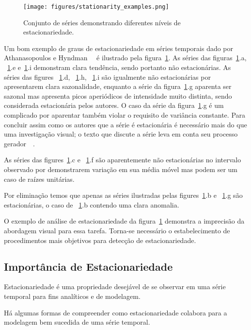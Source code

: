 \begin{figure}[h]
    \centering
    \texttt{[image: figures/stationarity\_examples.png]}
    \caption{Conjunto de séries demonstrando diferentes níveis de
    estacionariedade.}
    \label{fig:stationarity}
\end{figure}

Um bom exemplo de graus de estacionariedade em séries temporais dado por
Athanasopoulos e Hyndman~~\cite{athana} é ilustrado pela
figura~\ref{fig:stationarity}. As séries das figuras~\ref{fig:stationarity}.a,
~\ref{fig:stationarity}.e e~\ref{fig:stationarity}.i demonstram clara
tendência, sendo portanto não estacionárias. As séries das figures
~\ref{fig:stationarity}.d, ~\ref{fig:stationarity}.h, ~\ref{fig:stationarity}.i
são igualmente não estacionárias por apresentarem clara sazonalidade, enquanto
a série da figura~\ref{fig:stationarity}.g aparenta ser sazonal mas apresenta
picos aperiódicos de intensidade muito distinta, sendo considerada estacionária
pelos autores. O caso da série da figura~\ref{fig:stationarity}.g é um
complicado por aparentar também violar o requisito de variância constante. Para
concluir assim como os autores que a série é estacionária é necessário mais do
que uma investigação visual; o texto que discute a série leva em conta seu
processo gerador~~\cite{athana}.

As séries das figures~\ref{fig:stationarity}.c e ~\ref{fig:stationarity}.f são
aparentemente não estacionárias no intervalo observado por demonstrarem
variação em sua média móvel mas podem ser um caso de raízes unitárias.

Por eliminação temos que apenas as séries ilustradas pelas
figures~\ref{fig:stationarity}.b e ~\ref{fig:stationarity}.g são estacionárias,
o caso de ~\ref{fig:stationarity}.b contendo uma clara anomalia.

O exemplo de análise de estacionariedade da figura~\ref{fig:stationarity}
demonstra a imprecisão da abordagem visual para essa tarefa. Torna-se
necessário o estabelecimento de procedimentos mais objetivos para detecção de
estacionariedade.

\subsection{Importância de Estacionariedade}

Estacionariedade é uma propriedade desejável de se observar em uma série
temporal para fins analíticos e de modelagem.

Há algumas formas de compreender como estacionariedade colabora para a
modelagem bem sucedida de uma série temporal.

